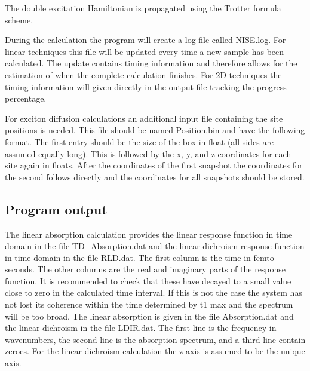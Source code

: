 The double excitation Hamiltonian is propagated using the Trotter formula scheme\cite{Paarmann.2008.JCP.128.191103,Jansen.2010.JCP.132.224503}.

During the calculation the program will create a log file called NISE.log. For linear techniques this file will be updated every time a new sample has been calculated. The update contains timing information and
therefore allows for the estimation of when the complete calculation finishes. For 2D techniques the timing information will given directly in the output file tracking the progress percentage.

For exciton diffusion calculations an additional input file containing the site positions is needed.
This file should be named Position.bin and have the following format. The first entry should be the
size of the box in float (all sides are assumed equally long). This is followed by the x, y, and z coordinates for each site again in floats. After the coordinates of the first snapshot the coordinates
for the second follows directly and the coordinates for all snapshots should be stored.


\subsection{Program output}
The linear absorption calculation provides the linear response function in time domain in the file TD\_Absorption.dat 
and the linear dichroism response function in time domain in the file RLD.dat. The first 
column is the time in femto seconds. The other columns are the real and imaginary parts 
of the response function. It is recommended to check that these have decayed to a small 
value close to zero in the calculated time interval. If this is not the case the system has 
not lost its coherence within the time determined by t1 max and the spectrum will be 
too broad. The linear absorption is given in the file Absorption.dat and the linear dichroism in 
the file LDIR.dat. The first line is the frequency in wavenumbers, the second line is the 
absorption spectrum, and a third line contain zeroes. For the linear dichroism calculation 
the z-axis is assumed to be the unique axis. 


